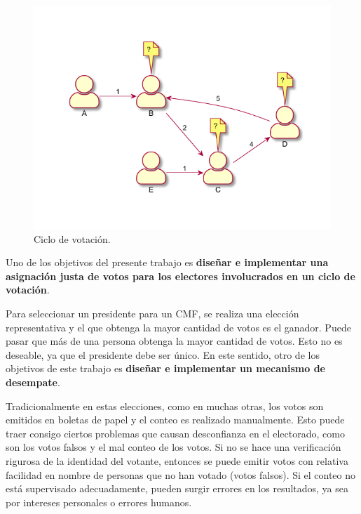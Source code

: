 \begin{figure}[h!]
    \centering
    \includegraphics{Graphics/voting-cycle.pdf}
    \caption{Ciclo de votaci\'on.}
    \label{fig:voting-cycle}
\end{figure}
Uno de los objetivos del presente trabajo es \textbf{dise\~nar e implementar una asignaci\'on justa de  votos para los electores involucrados en un ciclo de votación}. 

Para seleccionar un presidente para un CMF, se realiza una elecci\'on representativa y el que obtenga la mayor cantidad de votos es el ganador. Puede pasar que m\'as de una persona obtenga la mayor cantidad de votos.   Esto no es deseable, ya que el presidente debe ser \'unico. En este sentido, otro de los objetivos de este trabajo es \textbf{dise\~nar e implementar un mecanismo de desempate}.


Tradicionalmente en estas elecciones, como en muchas otras, los votos son emitidos en boletas de papel y el conteo es realizado manualmente. Esto puede traer consigo ciertos problemas que causan desconfianza en el electorado, como son los votos falsos y el mal conteo de los votos.   Si no se hace una verificaci\'on rigurosa de la identidad del votante, entonces se puede emitir votos con relativa facilidad en nombre de personas que no han votado (votos falsos). Si el conteo no est\'a supervisado adecuadamente, pueden surgir errores en los resultados, ya sea por intereses personales o errores humanos.

